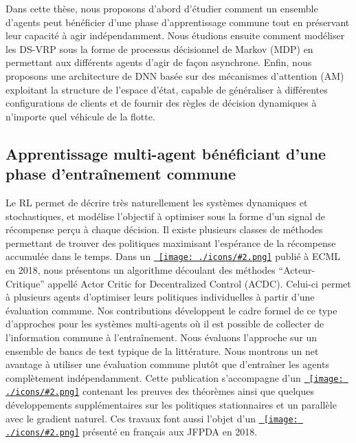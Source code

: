 \documentclass[a4paper, 11pt]{article}
\newcommand{\useicon}[2][8pt]{\texttt{[image: ./icons/\#2.png]}}
\newcommand{\jumpto}[2]{\hyperref[#2]{\color{cyan!70!black}{#1}~\useicon{jump}}}
\begin{document}
    \hspace{7mm}Dans cette th{\`e}se, nous proposons d'abord d'{\'e}tudier comment un ensemble d'agents peut b{\'e}n{\'e}ficier
    d'une phase d'apprentissage commune tout en pr{\'e}servant leur capacit{\'e} {\`a} agir ind{\'e}pendamment.
    Nous {\'e}tudions ensuite comment mod{\'e}liser les DS-VRP sous la forme de processus d{\'e}cisionnel de Markov (MDP)
    en permettant aux diff{\'e}rents agents d'agir de fa{\c c}on asynchrone.
    Enfin, nous proposons une architecture de DNN bas{\'e}e sur des m{\'e}canismes d'attention (AM) exploitant la structure
    de l'espace d'{\'e}tat, capable de g{\'e}n{\'e}raliser {\`a} diff{\'e}rentes configurations de clients
    et de fournir des r{\`e}gles de d{\'e}cision dynamiques {\`a} n'importe quel v{\'e}hicule de la flotte.

    \subsection*{Apprentissage multi-agent b{\'e}n{\'e}ficiant d'une phase d'entra{\^i}nement commune}
    \hspace{7mm}Le RL permet de d{\'e}crire tr{\`e}s naturellement les syst{\`e}mes dynamiques et stochastiques,
    et mod{\'e}lise l'objectif {\`a} optimiser sous la forme d'un signal de r{\'e}compense per{\c c}u {\`a} chaque d{\'e}cision.
    Il existe plusieurs classes de m{\'e}thodes permettant de trouver des politiques
    maximisant l'esp{\'e}rance de la r{\'e}compense accumul{\'e}e dans le temps.
    Dans un \jumpto{article}{ref:ecml} publi{\'e} {\`a} ECML en 2018, nous pr{\'e}sentons un algorithme d{\'e}coulant des m{\'e}thodes ``Acteur-Critique''
    appell{\'e} Actor Critic for Decentralized Control (ACDC). Celui-ci permet {\`a} plusieurs agents d'optimiser leurs politiques individuelles
    {\`a} partir d'une {\'e}valuation commune. Nos contributions d{\'e}veloppent le cadre formel de ce type d'approches pour les syst{\`e}mes multi-agents
    o{\`u} il est possible de collecter de l'information commune {\`a} l'entra{\^i}nement.
    Nous {\'e}valuons l'approche sur un ensemble de bancs de test typique de la litt{\'e}rature.
    Nous montrons un net avantage {\`a} utiliser une {\'e}valuation commune plut{\^o}t que d'entra{\^i}ner les agents compl{\`e}tement ind{\'e}pendamment.
    Cette publication s'accompagne d'un \jumpto{rapport de recherche}{ref:rapport} contenant les preuves des th{\'e}or{\`e}mes
    ainsi que quelques d{\'e}veloppements suppl{\'e}mentaires sur les politiques stationnaires et un parall{\`e}le avec le gradient naturel.
    Ces travaux font aussi l'objet d'un \jumpto{article}{ref:jfpda:18} pr{\'e}sent{\'e} en fran{\c c}ais aux JFPDA en 2018.
\end{document}
